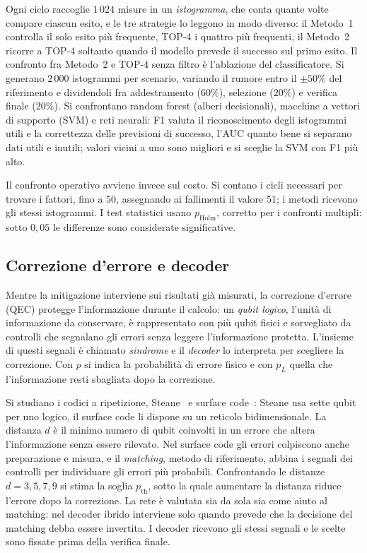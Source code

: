 Ogni ciclo raccoglie $1\,024$ misure in un \emph{istogramma}, che conta quante
volte compare ciascun esito, e le tre strategie lo leggono in modo diverso: il
Metodo~1 controlla il solo esito più frequente, TOP-4 i quattro più frequenti, il
Metodo~2 ricorre a TOP-4 soltanto quando il modello prevede il successo sul primo
esito.
Il confronto fra Metodo~2 e TOP-4 senza filtro è l'ablazione del classificatore.
Si generano $2\,000$ istogrammi per scenario, variando il rumore entro il
$\pm50\%$ del riferimento e dividendoli fra addestramento ($60\%$), selezione
($20\%$) e verifica finale ($20\%$).
Si confrontano random forest (alberi decisionali), macchine a vettori di supporto
(SVM) e reti neurali: F1 valuta il riconoscimento degli istogrammi utili e la
correttezza delle previsioni di successo, l'AUC quanto bene si separano dati
utili e inutili; valori vicini a uno sono migliori e si sceglie la SVM con F1 più
alto.

Il confronto operativo avviene invece sul costo.
Si contano i cicli necessari per trovare i fattori, fino a 50, assegnando ai
fallimenti il valore 51; i metodi ricevono gli stessi istogrammi.
I test statistici usano $p_{\mathrm{Holm}}$, corretto per i confronti multipli:
sotto $0{,}05$ le differenze sono considerate significative.

\subsection*{Correzione d'errore e decoder}

Mentre la mitigazione interviene sui risultati già misurati, la correzione
d'errore (QEC) protegge l'informazione durante il calcolo: un \emph{qubit
logico}, l'unità di informazione da conservare, è rappresentato con più qubit
fisici e sorvegliato da controlli che segnalano gli errori senza leggere
l'informazione protetta.
L'insieme di questi segnali è chiamato \emph{sindrome} e il \emph{decoder} lo
interpreta per scegliere la correzione.
Con $p$ si indica la probabilità di errore fisico e con $p_L$ quella che
l'informazione resti sbagliata dopo la correzione.

Si studiano i codici a ripetizione, Steane~\cite{steane1996} e surface
code~\cite{fowler2012}: Steane usa sette qubit per uno logico, il surface code li
dispone su un reticolo bidimensionale.
La distanza $d$ è il minimo numero di qubit coinvolti in un errore che altera
l'informazione senza essere rilevato.
Nel surface code gli errori colpiscono anche preparazione e misura, e il
\emph{matching}, metodo di riferimento, abbina i segnali dei controlli per
individuare gli errori più probabili.
Confrontando le distanze $d=3,5,7,9$ si stima la soglia $p_{\mathrm{th}}$, sotto
la quale aumentare la distanza riduce l'errore dopo la correzione.
La rete è valutata sia da sola sia come aiuto al matching: nel decoder ibrido
interviene solo quando prevede che la decisione del matching debba essere
invertita.
I decoder ricevono gli stessi segnali e le scelte sono fissate prima della
verifica finale.

